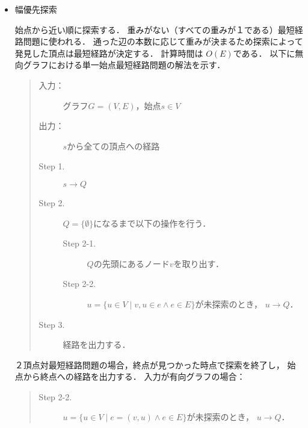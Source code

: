 \documentclass[12pt]{optlab-bachelor}
\begin{document}
\begin{itemize}
  \item 幅優先探索

  始点から近い順に探索する．
  重みがない（すべての重みが１である）最短経路問題に使われる．
  通った辺の本数に応じて重みが決まるため探索によって発見した頂点は最短経路が決定する．
  計算時間は $O(E)$である．
  以下に無向グラフにおける単一始点最短経路問題の解法を示す．

  \begin{quote}
    \begin{description}
      \item[入力：] グラフ$G=(V,E)$，始点$s \in V$
      \item[出力：] $s$から全ての頂点への経路
      \item[Step 1.] $s \rightarrow Q$
      \item[Step 2.] $Q = \{\emptyset\}$になるまで以下の操作を行う．
      \begin{description}
        \item[Step 2-1.] $Q$の先頭にあるノード$v$を取り出す．
        \item[Step 2-2.] $u = \{u \in V \mid v,u \in e \land e \in E\}$が未探索のとき，
        $u \rightarrow Q$．
      \end{description}

      \item[Step 3.] 経路を出力する．
    \end{description}
  \end{quote}
  ２頂点対最短経路問題の場合，終点が見つかった時点で探索を終了し，
  始点から終点への経路を出力する．
  入力が有向グラフの場合：
  \begin{quote}
    \begin{description}
      \item[Step 2-2.] $u = \{u \in V \mid e = (v,u) \land e \in E\}$が未探索のとき，
      $u \rightarrow Q$．
    \end{description}
  \end{quote}
\end{itemize}
\end{document}
